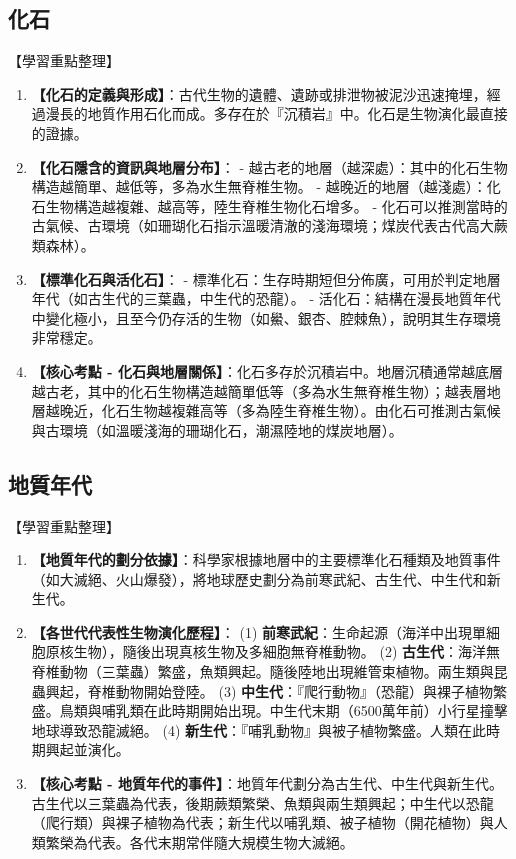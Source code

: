 \documentclass[11pt,a4paper]{article}
\begin{document}
\subsection{化石}
\begin{learningpoints}{【學習重點整理】}
\begin{enumerate}[label=\arabic*.]
  \item \textbf{【化石的定義與形成】}：古代生物的遺體、遺跡或排泄物被泥沙迅速掩埋，經過漫長的地質作用石化而成。多存在於『沉積岩』中。化石是生物演化最直接的證據。
  \item \textbf{【化石隱含的資訊與地層分布】}：
  - 越古老的地層（越深處）：其中的化石生物構造越簡單、越低等，多為水生無脊椎生物。
  - 越晚近的地層（越淺處）：化石生物構造越複雜、越高等，陸生脊椎生物化石增多。
  - 化石可以推測當時的古氣候、古環境（如珊瑚化石指示溫暖清澈的淺海環境；煤炭代表古代高大蕨類森林）。
  \item \textbf{【標準化石與活化石】}：
  - 標準化石：生存時期短但分佈廣，可用於判定地層年代（如古生代的三葉蟲，中生代的恐龍）。
  - 活化石：結構在漫長地質年代中變化極小，且至今仍存活的生物（如鱟、銀杏、腔棘魚），說明其生存環境非常穩定。
  \item \textbf{【核心考點 - 化石與地層關係】}：化石多存於沉積岩中。地層沉積通常越底層越古老，其中的化石生物構造越簡單低等（多為水生無脊椎生物）；越表層地層越晚近，化石生物越複雜高等（多為陸生脊椎生物）。由化石可推測古氣候與古環境（如溫暖淺海的珊瑚化石，潮濕陸地的煤炭地層）。
\end{enumerate}
\end{learningpoints}

\subsection{地質年代}
\begin{learningpoints}{【學習重點整理】}
\begin{enumerate}[label=\arabic*.]
  \item \textbf{【地質年代的劃分依據】}：科學家根據地層中的主要標準化石種類及地質事件（如大滅絕、火山爆發），將地球歷史劃分為前寒武紀、古生代、中生代和新生代。
  \item \textbf{【各世代代表性生物演化歷程】}：
  (1) \textbf{前寒武紀}：生命起源（海洋中出現單細胞原核生物），隨後出現真核生物及多細胞無脊椎動物。
  (2) \textbf{古生代}：海洋無脊椎動物（三葉蟲）繁盛，魚類興起。隨後陸地出現維管束植物。兩生類與昆蟲興起，脊椎動物開始登陸。
  (3) \textbf{中生代}：『爬行動物』（恐龍）與裸子植物繁盛。鳥類與哺乳類在此時期開始出現。中生代末期（6500萬年前）小行星撞擊地球導致恐龍滅絕。
  (4) \textbf{新生代}：『哺乳動物』與被子植物繁盛。人類在此時期興起並演化。
  \item \textbf{【核心考點 - 地質年代的事件】}：地質年代劃分為古生代、中生代與新生代。古生代以三葉蟲為代表，後期蕨類繁榮、魚類與兩生類興起；中生代以恐龍（爬行類）與裸子植物為代表；新生代以哺乳類、被子植物（開花植物）與人類繁榮為代表。各代末期常伴隨大規模生物大滅絕。
\end{enumerate}
\end{learningpoints}
\end{document}

